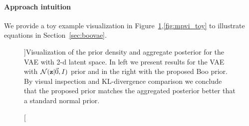 \paragraph{Approach intuition} We provide a toy example visualization in Figure~\ref{fig:2dkek},\ref{fig:mpvi_toy} to illustrate equations in Section~\ref{sec:boovae}.
\begin{figure}[t!]
	\centering
	 \hfill
		\caption[][\baselineskip]{Visualization of the prior density and aggregate posterior for the VAE with 2-d latent space. In left we present results for the VAE with $\mathcal{N}({\mathbf{z}}|\vec{0}, I)$ prior and in the right with the proposed Boo prior. By visual inspection and KL-divergence comparison we conclude that the proposed prior matches the aggregated posterior better that a standard normal prior.}\label{fig:2dkek}
	\vspace*{\baselineskip}
\end{figure}
